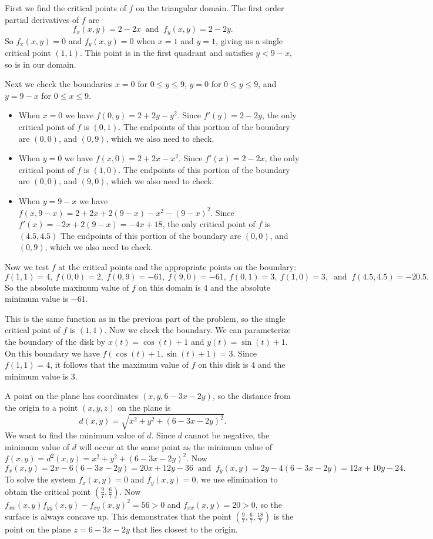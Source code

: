 \begin{exercises}
\begin{exerciseSolution}
  
  \item First we find the critical points of $f$ on the triangular domain. The first order partial derivatives of $f$ are 
\[f_x(x,y) = 2-2x \ \text{ and } \ f_y(x,y) = 2 - 2y.\]
So $f_x(x,y) = 0$ and $f_y(x,y) = 0$ when $x=1$ and $y=1$, giving us a single critical point $(1,1)$. This point is in the first quadrant and satisfies $y < 9-x$, so is in our domain. 

Next we check the boundaries $x=0$ for $0 \leq y \leq 9$, $y=0$ for $0 \leq y \leq 9$, and $y=9-x$ for $0 \leq x \leq 9$. 
\begin{itemize}
\item When $x=0$ we have $f(0,y) = 2+2y-y^2$. Since $f'(y) = 2-2y$, the only critical point of $f$ is $(0,1)$. The endpoints of this portion of the boundary are $(0,0)$, and $(0,9)$, which we also need to check.
\item When $y=0$ we have $f(x,0) = 2+2x-x^2$. Since $f'(x) = 2-2x$, the only critical point of $f$ is $(1,0)$. The endpoints of this portion of the boundary are $(0,0)$, and $(9,0)$, which we also need to check.
\item When $y=9-x$ we have $f(x,9-x) = 2+2x+2(9-x)-x^2-(9-x)^2$. Since $f'(x) = -2x+2(9-x) = -4x+18$, the only critical point of $f$ is $(4.5,4.5)$ The endpoints of this portion of the boundary are $(0,0)$, and $(0,9)$, which we also need to check.
\end{itemize}
Now we test $f$ at the critical points and the appropriate points on the boundary:
\[f(1,1) = 4, \ f(0,0)=2, \ f(0,9) = -61, \ f(9,0) = -61, \ f(0,1) = 3, \ f(1,0)=3, \ \text{ and } \ f(4.5,4.5) = -20.5.\]
So the absolute maximum value of $f$ on this domain is 4 and the absolute minimum value is $-61$. 	


  \item This is the same function as in the previous part of the problem, so the single critical point of $f$ is $(1,1)$. Now we check the boundary. We can parameterize the boundary of the disk by $x(t) = \cos(t)+1$ and $y(t)=\sin(t)+1$. On this boundary we have $f(\cos(t)+1, \sin(t)+1) = 3$. Since $f(1,1) = 4$, it follows that the maximum value of $f$ on this disk is 4 and the minimum value is 3. 
  
  \item A point on the plane has coordinates $(x,y,6-3x-2y)$, so the distance from the origin to a point $(x,y,z)$ on the plane is 
\[d(x,y) = \sqrt{x^2+y^2+(6-3x-2y)^2}.\]
We want to find the minimum value of $d$. Since $d$ cannot be negative, the minimum value of $d$ will occur at the same point as the minimum value of $f(x,y)=d^2(x,y) = x^2+y^2+(6-3x-2y)^2$. Now
\[f_x(x,y) = 2x-6(6-3x-2y) = 20x+12y-36 \ \text{ and } \ f_y(x,y) =  2y-4(6-3x-2y) = 12x+10y-24.\]
To solve the system $f_x(x,y)=0$ and $f_y(x,y)=0$, we use elimination to obtain the critical point $\left(\frac{9}{7}, \frac{6}{7}\right)$. Now 
$f_{xx}(x,y)f_{yy}(x,y) - f_{xy}(x,y)^2 = 56 > 0$ and $f_{xx}(x,y) = 20 > 0$, so the surface is always concave up. This demonstrates that the point $\left(\frac{9}{7}, \frac{6}{7}, \frac{18}{7}\right)$ is the point on the plane $z = 6 - 3x - 2y$ that lies closest to the origin.


\end{exerciseSolution}
\end{exercises}
